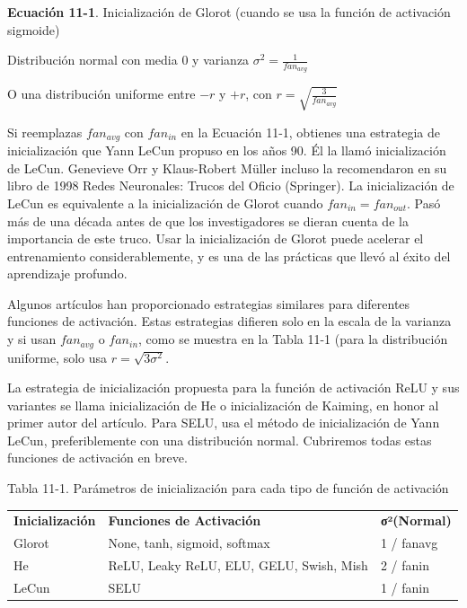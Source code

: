 \documentclass[11pt]{article}
\begin{document}
\textbf{Ecuación 11-1}. Inicialización de Glorot (cuando se usa la función de activación sigmoide)

Distribución normal con media 0 y varianza \(\sigma^{2} = \frac{1}{fan_{avg}}\)

O una distribución uniforme entre \(-r\) y \(+r\), con \(r = \sqrt{\frac{3}{fan_{avg}} }\)

Si reemplazas \(fan_{avg}\) con \(fan_{in}\) en la Ecuación 11-1, obtienes
una estrategia de inicialización que Yann LeCun propuso en los
años 90. Él la llamó inicialización de LeCun. Genevieve Orr y
Klaus-Robert Müller incluso la recomendaron en su libro de 1998 Redes
Neuronales: Trucos del Oficio (Springer). La inicialización de LeCun
es equivalente a la inicialización de Glorot cuando \(fan_{in} =
fan_{out}\). Pasó más de una década antes de que los investigadores se
dieran cuenta de la importancia de este truco. Usar la inicialización
de Glorot puede acelerar el entrenamiento considerablemente, y es una
de las prácticas que llevó al éxito del aprendizaje profundo.

Algunos artículos han proporcionado estrategias similares para
diferentes funciones de activación. Estas estrategias difieren solo en
la escala de la varianza y si usan \(fan_{avg}\) o \(fan_{in}\), como se
muestra en la Tabla 11-1 (para la distribución uniforme, solo usa
\(r=\sqrt{3\sigma^{2}}\).

La estrategia de inicialización propuesta para la función de
activación ReLU y sus variantes se llama inicialización de He o
inicialización de Kaiming, en honor al primer autor del artículo. Para
SELU, usa el método de inicialización de Yann LeCun, preferiblemente
con una distribución normal.  Cubriremos todas estas funciones de
activación en breve.

Tabla 11-1. Parámetros de inicialización para cada tipo de función de activación
\begin{center}
\begin{tabular}{lll}
 &  & \\[0pt]
\hline
\textbf{Inicialización} & \textbf{Funciones de Activación} & \textbf{σ²(Normal)}\\[0pt]
\hline
\hline
Glorot & None, tanh, sigmoid, softmax & 1 / fanavg\\[0pt]
\hline
He & ReLU, Leaky ReLU, ELU, GELU, Swish, Mish & 2 / fanin\\[0pt]
\hline
LeCun & SELU & 1 / fanin\\[0pt]
\hline
\end{tabular}
\end{center}
\end{document}
